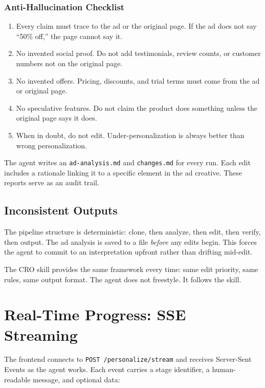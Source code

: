 \documentclass{article}
\begin{document}
\subsubsection*{Anti-Hallucination Checklist}
\begin{enumerate}[leftmargin=1.5em]
    \item Every claim must trace to the ad or the original page. If the ad does not say ``50\% off,'' the page cannot say it.
    \item No invented social proof. Do not add testimonials, review counts, or customer numbers not on the original page.
    \item No invented offers. Pricing, discounts, and trial terms must come from the ad or original page.
    \item No speculative features. Do not claim the product does something unless the original page says it does.
    \item When in doubt, do not edit. Under-personalization is always better than wrong personalization.
\end{enumerate}


The agent writes an \texttt{ad-analysis.md} and \texttt{changes.md} for every run. Each edit includes a rationale linking it to a specific element in the ad creative. These reports serve as an audit trail.

\subsection{Inconsistent Outputs}

The pipeline structure is deterministic: clone, then analyze, then edit, then verify, then output. The ad analysis is saved to a file \textit{before} any edits begin. This forces the agent to commit to an interpretation upfront rather than drifting mid-edit.

The CRO skill provides the same framework every time: same edit priority, same rules, same output format. The agent does not freestyle. It follows the skill.

\section{Real-Time Progress: SSE Streaming}

The frontend connects to \texttt{POST /personalize/stream} and receives Server-Sent Events as the agent works. Each event carries a stage identifier, a human-readable message, and optional data:
\end{document}
